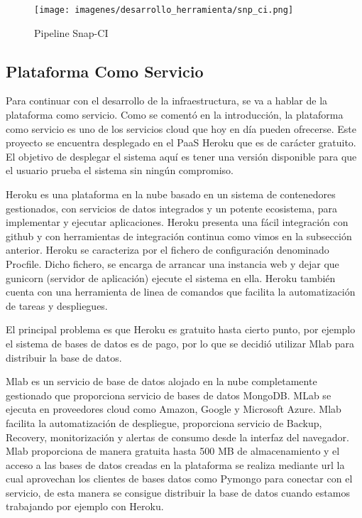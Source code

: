 \documentclass[a4paper,11pt]{book}
\begin{document}
\begin{figure}[H] 
\centering 
\texttt{[image: imagenes/desarrollo\_herramienta/snp\_ci.png]}
\caption{ Pipeline Snap-CI\cite{snapP}  }  
\end{figure}  	





\subsection{Plataforma Como Servicio}

Para continuar con el desarrollo de la infraestructura, se va a hablar de la plataforma como servicio. Como se comentó en la introducción, la plataforma como servicio es uno de los servicios cloud que hoy en día pueden ofrecerse. Este proyecto se encuentra desplegado en el PaaS Heroku\cite{hero} que es de carácter gratuito. El objetivo de desplegar el sistema aquí es tener una versión disponible para que el usuario prueba el sistema sin ningún compromiso.
 	
 

Heroku es una plataforma en la nube basado en un sistema de contenedores gestionados, con servicios de datos integrados y un potente ecosistema, para implementar y ejecutar aplicaciones. Heroku presenta una fácil integración con github y con herramientas de integración continua como vimos en la subsección anterior. Heroku se caracteriza por el fichero de configuración denominado Procfile. Dicho fichero, se encarga de arrancar una instancia web y dejar que gunicorn (servidor de aplicación) ejecute el sistema en ella. Heroku también cuenta con una herramienta de linea de comandos que facilita la automatización de tareas y despliegues. 

El principal problema es que Heroku es gratuito hasta cierto punto, por ejemplo el sistema de bases de datos es de pago, por lo que se decidió utilizar Mlab para distribuir la base de datos.

Mlab\cite{mlab} es un servicio de base de datos alojado en la nube completamente gestionado que proporciona servicio de bases de datos MongoDB. MLab se ejecuta en proveedores cloud como Amazon, Google y Microsoft Azure. Mlab facilita la automatización de despliegue, proporciona servicio de Backup, Recovery, monitorización y alertas de consumo desde la interfaz del navegador. Mlab proporciona de manera gratuita hasta 500 MB de almacenamiento y el acceso a las bases de datos creadas en la plataforma se realiza mediante url la cual aprovechan los clientes de bases datos como Pymongo para conectar con el servicio, de esta manera se consigue distribuir la base de datos cuando estamos trabajando por ejemplo con Heroku. 
\end{document}
